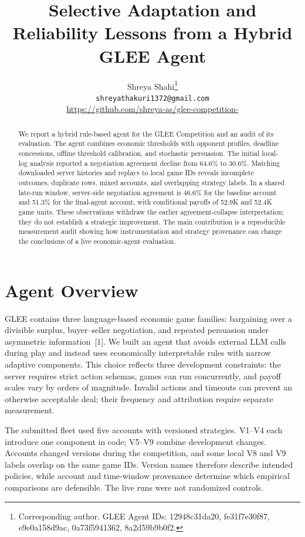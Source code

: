 \documentclass{article}
\title{Selective Adaptation and Reliability Lessons from a Hybrid GLEE Agent}
\author{%
Shreya Shahi\thanks{Corresponding author. GLEE Agent IDs: 12948c31da20, fe31f7e30f87, e9e0a158d9ac, 0a73f5941362, 8a2d59b9b0f2.} \\
\texttt{shreyathakuri1372@gmail.com} \\
\url{https://github.com/shreya-as/glee-competition-}
}
\begin{document}
\maketitle

\begin{abstract}
We report a hybrid rule-based agent for the GLEE Competition and an audit of its evaluation. The agent combines economic thresholds with opponent profiles, deadline concessions, offline threshold calibration, and stochastic persuasion. The initial local-log analysis reported a negotiation agreement decline from 64.6\% to 30.6\%. Matching downloaded server histories and replays to local game IDs reveals incomplete outcomes, duplicate rows, mixed accounts, and overlapping strategy labels. In a shared late-run window, server-side negotiation agreement is 46.6\% for the baseline account and 51.3\% for the final-agent account, with conditional payoffs of 52.9K and 52.4K game units. These observations withdraw the earlier agreement-collapse interpretation; they do not establish a strategic improvement. The main contribution is a reproducible measurement audit showing how instrumentation and strategy provenance can change the conclusions of a live economic-agent evaluation.
\end{abstract}

\section{Agent Overview}

GLEE contains three language-based economic game families: bargaining over a divisible surplus, buyer--seller negotiation, and repeated persuasion under asymmetric information~[1]. We built an agent that avoids external LLM calls during play and instead uses economically interpretable rules with narrow adaptive components. This choice reflects three development constraints: the server requires strict action schemas, games can run concurrently, and payoff scales vary by orders of magnitude. Invalid actions and timeouts can prevent an otherwise acceptable deal; their frequency and attribution require separate measurement.

The submitted fleet used five accounts with versioned strategies. V1--V4 each introduce one component in code; V5--V9 combine development changes. Accounts changed versions during the competition, and some local V8 and V9 labels overlap on the same game IDs. Version names therefore describe intended policies, while account and time-window provenance determine which empirical comparisons are defensible. The live runs were not randomized controls.
\end{document}
